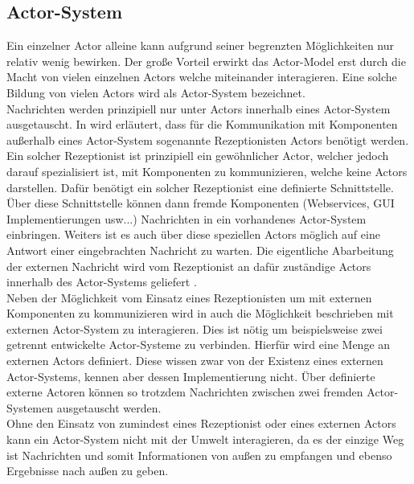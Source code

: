\subsection{Actor-System}\label{actor:actorSystem}
Ein einzelner Actor alleine kann aufgrund seiner begrenzten Möglichkeiten nur relativ wenig bewirken. Der große Vorteil erwirkt das Actor-Model erst durch die Macht von vielen einzelnen Actors welche miteinander interagieren. Eine solche Bildung von vielen Actors wird als Actor-System bezeichnet.\citep{Agha1985ActorsSystems} \\

Nachrichten werden prinzipiell nur unter Actors innerhalb eines Actor-System ausgetauscht. In \cite{Agha1985ActorsSystems} wird erläutert, dass für die Kommunikation mit Komponenten außerhalb eines Actor-System sogenannte Rezeptionisten Actors benötigt werden.\\
Ein solcher Rezeptionist ist prinzipiell ein gewöhnlicher Actor, welcher jedoch darauf spezialisiert ist, mit Komponenten zu kommunizieren, welche keine Actors darstellen. Dafür benötigt ein solcher Rezeptionist eine definierte Schnittstelle. Über diese Schnittstelle können dann fremde Komponenten (Webservices, GUI Implementierungen usw...) Nachrichten in ein vorhandenes Actor-System einbringen. Weiters ist es auch über diese speziellen Actors möglich auf eine Antwort einer eingebrachten Nachricht zu warten. Die eigentliche Abarbeitung der externen Nachricht wird vom Rezeptionist an dafür zuständige Actors innerhalb des Actor-Systems geliefert \citep{Agha1985ActorsSystems}.\\
Neben der Möglichkeit vom Einsatz eines Rezeptionisten um mit externen Komponenten zu kommunizieren wird in \cite{Agha1985ActorsSystems} auch die Möglichkeit beschrieben mit externen Actor-System zu interagieren. Dies ist nötig um beispielsweise zwei getrennt entwickelte Actor-Systeme zu verbinden. Hierfür wird eine Menge an externen Actors definiert. Diese wissen zwar von der Existenz eines externen Actor-Systems, kennen aber dessen Implementierung nicht. Über definierte externe Actoren können so trotzdem Nachrichten zwischen zwei fremden Actor-Systemen ausgetauscht werden. \\
Ohne den Einsatz von zumindest eines Rezeptionist oder eines externen Actors kann ein Actor-System nicht mit der Umwelt interagieren, da es der einzige Weg ist Nachrichten und somit Informationen von außen zu empfangen und ebenso Ergebnisse nach außen zu geben. 







